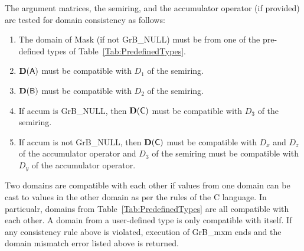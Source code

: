 The argument matrices, the semiring, and the accumulator operator (if provided) are tested for domain consistency
as follows:
\begin{enumerate}

	\item The domain of {\sf Mask} (if not {\sf GrB\_NULL}) must be from one of the pre-defined types of Table~\ref{Tab:PredefinedTypes}.

	\item $\bold{D}({\bf \sf A})$ must be compatible with $D_1$ of the semiring.

	\item $\bold{D}({\bf \sf B})$ must be compatible with $D_2$ of the semiring.

	\item If {\sf accum} is {\sf GrB\_NULL}, then $\bold{D}({\bf \sf C})$ must be compatible with $D_3$ of the semiring.

	\item If {\sf accum} is not {\sf GrB\_NULL}, then $\bold{D}({\bf \sf C})$ must be compatible with $D_x$ and $D_z$ of the 
	accumulator operator and $D_3$ of the semiring must be compatible with $D_y$ of the accumulator operator.

\end{enumerate}
Two domains are compatible with each other if values from one domain can be cast to values in the other domain as per the rules of the C language.
In particualr, domains from Table~\ref{Tab:PredefinedTypes} are all compatible with each other. A domain from a user-defined type is only compatible with itself.
If any consistency rule above is violated, execution of {\sf GrB\_mxm} ends and the domain mismatch error listed above is returned.

